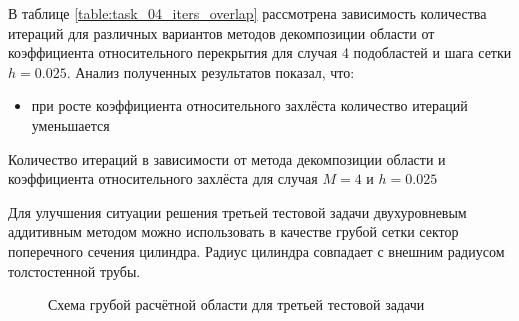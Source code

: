 \documentclass[a4paper]{article}
\begin{document}
В таблице \ref{table:task_04_iters_overlap} рассмотрена зависимость количества итераций для различных вариантов методов декомпозиции области от коэффициента относительного перекрытия для случая 4 подобластей и шага сетки $h = 0.025$. Анализ полученных результатов показал, что:
\begin{itemize}
\item при росте коэффициента относительного захлёста количество итераций уменьшается
\end{itemize}

\begin{table}[h]
\caption{Количество итераций в зависимости от метода декомпозиции области и коэффициента относительного захлёста для случая $M = 4$ и $h = 0.025$}
\label{table:task_04_iters_overlap}
\end{table}

\newpage

Для улучшения ситуации решения третьей тестовой задачи двухуровневым аддитивным методом можно использовать в качестве грубой сетки сектор поперечного сечения цилиндра. Радиус цилиндра совпадает с внешним радиусом толстостенной трубы.

\begin{figure}[h]
\caption{Схема грубой расчётной области для третьей тестовой задачи}
\label{fig:task_04_area_coarse_1}
\end{figure}
\end{document}
